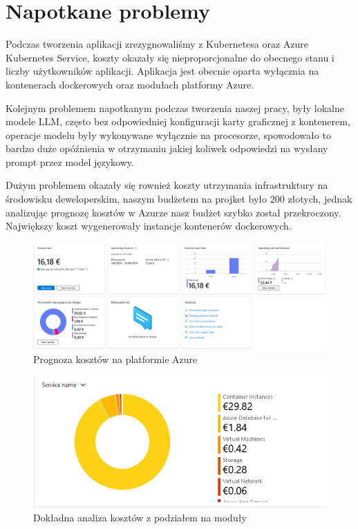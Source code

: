 \section{Napotkane problemy}
Podczas tworzenia aplikacji zrezygnowaliśmy z Kubernetesa oraz Azure Kubernetes Service, koszty okazały się nieproporcjonalne do obecnego stanu i liczby użytkowników aplikacji. Aplikacja jest obecnie oparta wyłącznia na kontenerach dockerowych oraz modułach platformy Azure.

Kolejnym problemem napotkanym podczas tworzenia naszej pracy, były lokalne modele LLM, często bez odpowiedniej konfiguracji karty graficznej z kontenerem, operacje modelu były wykonywane wyłącznie na procesorze, spowodowało to bardzo duże opóźnienia w otrzymaniu jakiej koliwek odpowiedzi na wysłany prompt przez model językowy.

Dużym problemem okazały się rownież koszty utrzymania infrastruktury na środowisku deweloperskim, naszym budżetem na projket było 200 złotych, jednak analizując prognozę kosztów w Azurze nasz budżet szybko został przekroczony. Największy koszt wygenerowały instancje kontenerów dockerowych. 

\begin{figure}[h]
    \centering
    \includegraphics[width=1\textwidth]{Obrazy/costs.png}
    \caption{Prognoza kosztów na platformie Azure}
    \label{fig:my_label}
\end{figure}

\begin{figure}[h]
    \centering
    \includegraphics[width=1\textwidth]{Obrazy/costs3.png}
    \caption{Dokładna analiza kosztów z podziałem na moduły}
    \label{fig:my_label}
\end{figure}


